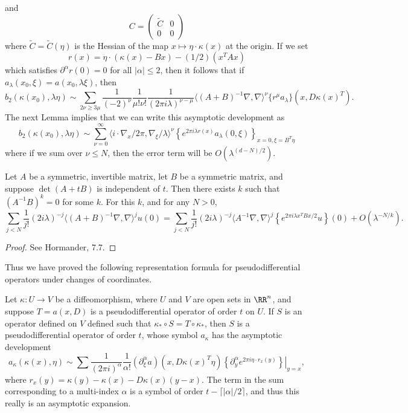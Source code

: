 %
and
%
\[ C = \begin{pmatrix} \tilde{C} & 0 \\ 0 & 0 \end{pmatrix} \]
%
where $\tilde{C} = \tilde{C}(\eta)$ is the Hessian of the map $x \mapsto \eta \cdot \kappa(x)$ at the origin. If we set
%
\[ r(x) = \eta \cdot (\kappa(x) - Bx) - (1/2)(x^T A x) \]
%
which satisfies $\partial^\alpha r(0) = 0$ for all $|\alpha| \leq 2$, then it follows that if $a_\lambda(x_0,\xi) = a(x_0,\lambda \xi)$, then
\[ b_2(\kappa(x_0),\lambda \eta) \sim \sum_{2 \nu \geq 3 \mu} \frac{1}{(-2)^\nu} \frac{1}{\mu! \nu!} \frac{1}{(2\pi i \lambda)^{\nu - \mu}} \langle (A + B)^{-1} \nabla, \nabla \rangle^\nu \{ r^\mu a_\lambda \}(x, D\kappa(x)^T). \]
%
The next Lemma implies that we can write this asymptotic development as
%
\[ b_2(\kappa(x_0),\lambda \eta) \sim \sum_{\nu = 0}^\infty \langle i \cdot \nabla_x / 2\pi, \nabla_\xi / \lambda \rangle^\nu \left\{ e^{2 \pi i \lambda r(x)} a_\lambda(0,\xi) \right\}_{x = 0, \xi = B^T \eta} \]
%
where if we sum over $\nu \leq N$, then the error term will be $O(\lambda^{(d-N)/2})$.

\begin{lemma}
    Let $A$ be a symmetric, invertible matrix, let $B$ be a symmetric matrix, and suppose $\det(A + tB)$ is independent of $t$. Then there exists $k$ such that $(A^{-1}B)^k = 0$ for some $k$. For this $k$, and for any $N > 0$,
    \[ \sum_{j < N} \frac{1}{j!} (2 i \lambda)^{-j} \langle (A + B)^{-1} \nabla, \nabla \rangle^j u(0) = \sum_{j < N} \frac{1}{j!} (2 i \lambda)^{-j} \langle A^{-1}\nabla, \nabla \rangle^j \left\{ e^{2 \pi i \lambda x^T B x / 2} u \right\}(0) + O(\lambda^{-N/k}). \]
\end{lemma}
\begin{proof}
    See Hormander, 7.7.
\end{proof}

Thus we have proved the following representation formula for pseudodifferential operators under changes of coordinates.

\begin{theorem}
    Let $\kappa: U \to V$ be a diffeomorphism, where $U$ and $V$ are open sets in $\RR^n$, and suppose $T = a(x,D)$ is a pseudodifferential operator of order $t$ on $U$. If $S$ is an operator defined on $V$ defined such that $\kappa_* \circ S = T \circ \kappa_*$, then $S$ is a pseudodifferential operator of order $t$, whose symbol $a_\kappa$ has the asymptotic development
    \[ a_\kappa(\kappa(x),\eta) \sim \sum \frac{1}{(2 \pi i)^\alpha} \frac{1}{\alpha!} (\partial^\alpha_\xi a) (x,D\kappa(x)^T \eta) \left. \left\{ \partial^\alpha_y e^{2\pi i \eta \cdot r_x(y)} \right\} \right|_{y = x}, \]
    where $r_x(y) = \kappa(y) - \kappa(x) - D\kappa(x)(y-x)$. The term in the sum corresponding to a multi-index $\alpha$ is a symbol of order $t - \lceil |\alpha| / 2 \rceil$, and thus this really is an asymptotic expansion.
\end{theorem}

